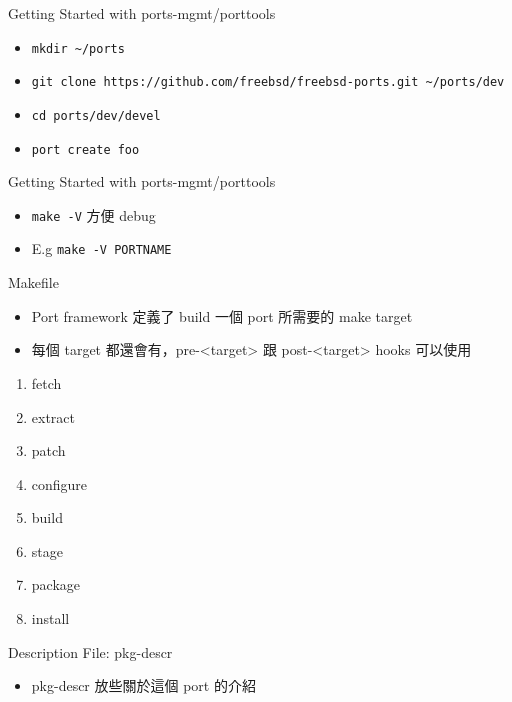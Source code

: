 \documentclass[aspectratio=169]{beamer}
\begin{document}
\begin{frame}[t,fragile]{Getting Started with ports-mgmt/porttools}
  \begin{itemize}
    \item \verb`mkdir ~/ports`
    \item \verb`git clone https://github.com/freebsd/freebsd-ports.git ~/ports/dev`
    \item \verb`cd ports/dev/devel`
    \item \verb`port create foo`
  \end{itemize}
\end{frame}

\begin{frame}[t,fragile]{Getting Started with ports-mgmt/porttools}
  \begin{itemize}
    \item \verb|make -V| 方便 debug
    \item E.g \verb|make -V PORTNAME|
  \end{itemize}
\end{frame}

\begin{frame}[t]{Makefile}
  \begin{itemize}
    \item Port framework 定義了 build 一個 port 所需要的 make target
    \item 每個 target 都還會有，pre-<target> 跟 post-<target> hooks 可以使用
  \end{itemize}
  \begin{enumerate}
    \item fetch
    \item extract
    \item patch
    \item configure
    \item build
    \item stage
    \item package
    \item install
  \end{enumerate}
\end{frame}

\begin{frame}[t,fragile]{Description File: pkg-descr}
  \begin{itemize}
    \item pkg-descr 放些關於這個 port 的介紹
  \end{itemize}
\end{frame}
\end{document}
